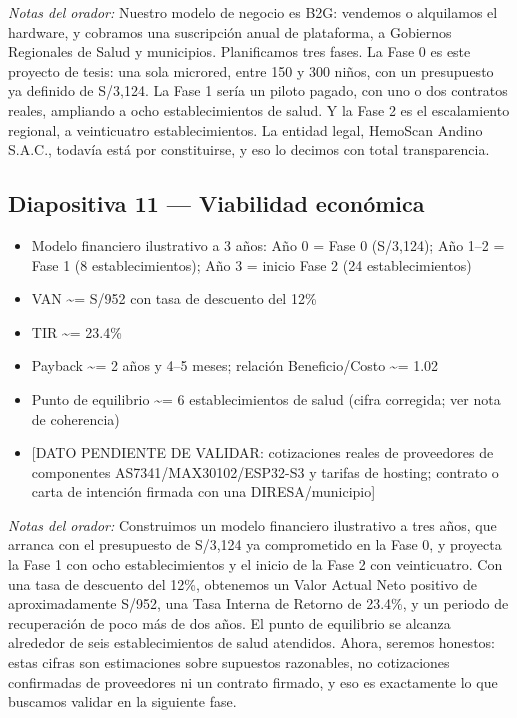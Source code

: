 \documentclass[11pt,a4paper]{article}
\providecommand{\tightlist}{%
  \setlength{\itemsep}{0pt}\setlength{\parskip}{0pt}}
\begin{document}
\emph{Notas del orador:} Nuestro modelo de negocio es B2G: vendemos o alquilamos el hardware, y cobramos una suscripción anual de plataforma, a Gobiernos Regionales de Salud y municipios. Planificamos tres fases. La Fase 0 es este proyecto de tesis: una sola microred, entre 150 y 300 niños, con un presupuesto ya definido de S/3,124. La Fase 1 sería un piloto pagado, con uno o dos contratos reales, ampliando a ocho establecimientos de salud. Y la Fase 2 es el escalamiento regional, a veinticuatro establecimientos. La entidad legal, HemoScan Andino S.A.C., todavía está por constituirse, y eso lo decimos con total transparencia.

\subsection{Diapositiva 11 --- Viabilidad económica}\label{diapositiva-11-viabilidad-econuxf3mica}

\begin{itemize}
\tightlist
\item
  Modelo financiero ilustrativo a 3 años: Año 0 = Fase 0 (S/3,124); Año 1--2 = Fase 1 (8 establecimientos); Año 3 = inicio Fase 2 (24 establecimientos)
\item
  VAN \textasciitilde= S/952 con tasa de descuento del 12\%
\item
  TIR \textasciitilde= 23.4\%
\item
  Payback \textasciitilde= 2 años y 4--5 meses; relación Beneficio/Costo \textasciitilde= 1.02
\item
  Punto de equilibrio \textasciitilde= 6 establecimientos de salud (cifra corregida; ver nota de coherencia)
\item
  {[}DATO PENDIENTE DE VALIDAR: cotizaciones reales de proveedores de componentes AS7341/MAX30102/ESP32-S3 y tarifas de hosting; contrato o carta de intención firmada con una DIRESA/municipio{]}
\end{itemize}

\emph{Notas del orador:} Construimos un modelo financiero ilustrativo a tres años, que arranca con el presupuesto de S/3,124 ya comprometido en la Fase 0, y proyecta la Fase 1 con ocho establecimientos y el inicio de la Fase 2 con veinticuatro. Con una tasa de descuento del 12\%, obtenemos un Valor Actual Neto positivo de aproximadamente S/952, una Tasa Interna de Retorno de 23.4\%, y un periodo de recuperación de poco más de dos años. El punto de equilibrio se alcanza alrededor de seis establecimientos de salud atendidos. Ahora, seremos honestos: estas cifras son estimaciones sobre supuestos razonables, no cotizaciones confirmadas de proveedores ni un contrato firmado, y eso es exactamente lo que buscamos validar en la siguiente fase.
\end{document}
